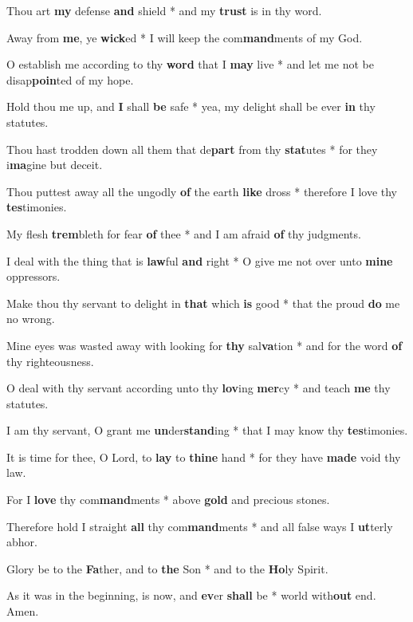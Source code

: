 \begin{multicols}{2}
	Thou art \textbf{my} defense \textbf{and} shield * and my \textbf{trust} is in thy word.
	
	Away from \textbf{me}, ye \textbf{wick}ed * I will keep the com\textbf{mand}ments of my God.
	
	O establish me according to thy \textbf{word} that I \textbf{may} live * and let me not be disap\textbf{poin}ted of my hope.
	
	Hold thou me up, and \textbf{I} shall \textbf{be} safe * yea, my delight shall be ever \textbf{in} thy statutes.
	
	Thou hast trodden down all them that de\textbf{part} from thy \textbf{stat}utes * for they i\textbf{ma}gine but deceit.
	
	Thou puttest away all the ungodly \textbf{of} the earth \textbf{like} dross * therefore I love thy \textbf{tes}timonies.
	
	My flesh \textbf{trem}bleth for fear \textbf{of} thee * and I am afraid \textbf{of} thy judgments.
	
	I deal with the thing that is \textbf{law}ful \textbf{and} right * O give me not over unto \textbf{mine} oppressors.
	
	Make thou thy servant to delight in \textbf{that} which \textbf{is} good * that the proud \textbf{do} me no wrong.
	
	Mine eyes was wasted away with looking for \textbf{thy} sal\textbf{va}tion * and for the word \textbf{of} thy righteousness.
	
	O deal with thy servant according unto thy \textbf{lov}ing \textbf{mer}cy * and teach \textbf{me} thy statutes.
	
	I am thy servant, O grant me \textbf{un}der\textbf{stand}ing * that I may know thy \textbf{tes}timonies.
	
	It is time for thee, O Lord, to \textbf{lay} to \textbf{thine} hand * for they have \textbf{made} void thy law.
	
	For I \textbf{love} thy com\textbf{mand}ments * above \textbf{gold} and precious stones.
	
	Therefore hold I straight \textbf{all} thy com\textbf{mand}ments * and all false ways I \textbf{ut}terly abhor.
	
	Glory be to the \textbf{Fa}ther, and to \textbf{the} Son * and to the \textbf{Ho}ly Spirit.
	
	As it was in the beginning, is now, and \textbf{ev}er \textbf{shall} be * world with\textbf{out} end. Amen.
\end{multicols}